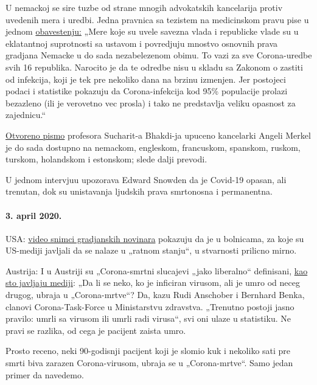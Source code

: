 U nemackoj se sire tuzbe od strane mnogih advokatskih kancelarija protiv
uvedenih mera i uredbi. Jedna pravnica sa tezistem na medicinskom pravu
pise u jednom
\href{http://beatebahner.de/lib.medien/aktualisierte\%20Pressemitteilung.pdf}{obavestenju:}
„Mere koje su uvele savezna vlada i republicke vlade su u eklatantnoj
suprotnosti sa ustavom i povredjuju mnostvo osnovnih prava gradjana
Nemacke u do sada nezabelezenom obimu. To vazi za sve Corona-uredbe svih
16 republika. Narocito je da te odredbe nisu u skladu sa Zakonom o
zastiti od infekcija, koji je tek pre nekoliko dana na brzinu izmenjen.
Jer postojeci podaci i statistike pokazuju da Corona-infekcija kod 95\%
populacije prolazi bezazleno (ili je verovetno vec prosla) i tako ne
predstavlja veliku opasnost za zajednicu.``

\href{https://swprs.org/offener-brief-von-professor-sucharit-bhakdi-an-bundeskanzlerin-dr-angela-merkel/}{Otvoreno
pismo} profesora Sucharit-a Bhakdi-ja upuceno kancelarki Angeli Merkel
je do sada dostupno na nemackom, engleskom, francuskom, spanskom,
ruskom, turskom, holandskom i estonskom; slede dalji prevodi.

U jednom intervjuu upozorava Edward Snowden da je Covid-19 opasan, ali
trenutan, dok su unistavanja ljudskih prava smrtonosna i permanentna.

\hypertarget{3-april-2020}{%
\paragraph{3. april 2020.}\label{3-april-2020}}

USA: \href{https://www.youtube.com/watch?v=5pIMD1enwd4}{video snimci
gradjanskih novinara} pokazuju da je u bolnicama, za koje su US-mediji
javljali da se nalaze u „ratnom stanju``, u stvarnosti prilicno mirno.

Austrija: I u Austriji su „Corona-smrtni slucajevi „jako liberalno``
definisani,
\href{https://www.heute.at/s/osterreich-bei-corona-todesstatistik-sehr-liberal-48665863}{kao
sto javljaju mediji}: „Da li se neko, ko je inficiran virusom, ali je
umro od neceg drugog, ubraja u „Corona-mrtve``? Da, kazu Rudi Anschober
i Bernhard Benka, clanovi Corona-Task-Force u Ministarstvu zdravstva.
„Trenutno postoji jasno pravilo: umrli sa virusom ili umrli radi
virusa``, svi oni ulaze u statistiku. Ne pravi se razlika, od cega je
pacijent zaista umro.

Prosto receno, neki 90-godisnji pacijent koji je slomio kuk i nekoliko
sati pre smrti biva zarazen Corona-virusom, ubraja se u „Corona-mrtve``.
Samo jedan primer da navedemo.


